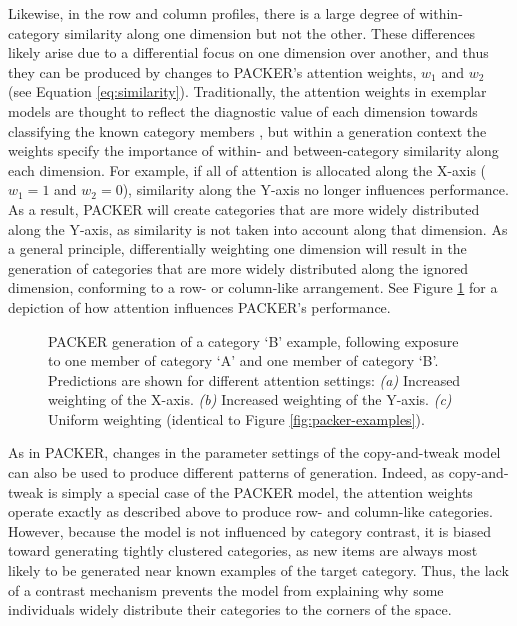 \documentclass[12pt]{article}
\newcommand\inputpgf[2]{{
\let\pgfimageWithoutPath\pgfimage
\renewcommand{\pgfimage}[2][]{\pgfimageWithoutPath[##1]{#1/##2}}

}}
\begin{document}
\begin{flushleft}
Likewise, in the row and column profiles, there is a large degree of
within-category similarity along one dimension but not the other. These
differences likely arise due to a differential focus on one dimension over
another, and thus they can be produced by changes to PACKER's attention weights,
$w_1$ and $w_2$ (see Equation \ref{eq:similarity}). Traditionally, the attention
weights in exemplar models are thought to reflect the diagnostic value of each
dimension towards classifying the known category members
\citep{nosofsky1984choice,nosofsky1986attention,kruschke1992alcove}, but within
a generation context the weights specify the importance of within- and
between-category similarity along each dimension. For example, if all of
attention is allocated along the X-axis ($w_1=1$ and $w_2=0$), similarity along
the Y-axis no longer influences performance. As a result, PACKER will create
categories that are more widely distributed along the Y-axis, as similarity is
not taken into account along that dimension. As a general principle,
differentially weighting one dimension will result in the generation of
categories that are more widely distributed along the ignored dimension,
conforming to a row- or column-like arrangement. See Figure
\ref{fig:packer-attention} for a depiction of how attention influences PACKER's
performance.

\begin{figure}
    \begin{center} \inputpgf{figs/}{packer-attention-examples.pgf}
    \caption{PACKER generation of a category `B' example, following exposure to
one member of category `A' and one member of category `B'. Predictions are shown
for different attention settings: {\em (a)} Increased weighting of the X-axis.
{\em (b)} Increased weighting of the Y-axis. {\em (c)} Uniform weighting
(identical to Figure \ref{fig:packer-examples}).}
    \label{fig:packer-attention}
    \end{center}
\end{figure}

As in PACKER, changes in the parameter settings of the copy-and-tweak model can
also be used to produce different patterns of generation. Indeed, as
copy-and-tweak is simply a special case of the PACKER model, the attention
weights operate exactly as described above to produce row- and column-like
categories. However, because the model is not influenced by category contrast,
it is biased toward generating tightly clustered categories, as new items are
always most likely to be generated near known examples of the target category.
Thus, the lack of a contrast mechanism prevents the model from explaining why
some individuals widely distribute their categories to the corners of the space.


\end{flushleft}
\end{document}

